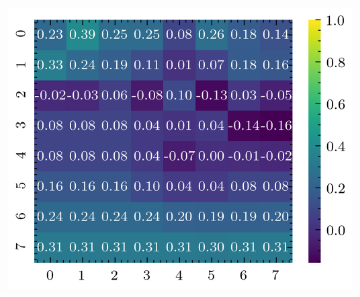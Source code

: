\begin{figure}[H]
\begin{subfigure}[b]{0.19\textwidth}
        \includegraphics[width=\linewidth]{../img/5/quarry/worst/heatmap-2d-4.png}
    \end{subfigure}  


\end{figure}
